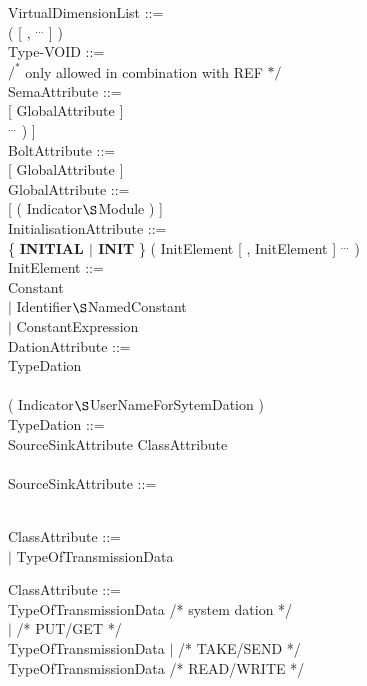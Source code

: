 VirtualDimensionList ::=\\
\x ( [ , $^{...}$ ] )\\

Type-VOID ::=\\
 \x $/^*$ only allowed in combination with REF $*/$\\

SemaAttribute ::=\\
 [ GlobalAttribute ]\\
\x [ {\bf PRESET} ( Constant-FIXED-Expression [ , Constant-FIXED-Expression ] $^{...}$ ) ]\\

BoltAttribute ::=\\
 [ GlobalAttribute ]\\

GlobalAttribute ::=\\
 [ ( Indicator$\S $Module ) ]\\

InitialisationAttribute ::=\\
\x \{ {\bf INITIAL $\mid$ INIT} \} ( InitElement [ , InitElement ] $^{...}$ )\\

InitElement ::=\\
\x Constant\\
\x $\mid$ Identifier$\S $NamedConstant\\
\x $\mid$ ConstantExpression\\

DationAttribute ::=\\
\x TypeDation\\
\x [ GlobalAttribute ]\\
 ( Indicator$\S $UserNameForSytemDation )\\

TypeDation ::=\\
 SourceSinkAttribute  ClassAttribute\\
\x [ Topology ] [ AccessAttribute ]\\

SourceSinkAttribute ::=\\
\\

\begin{removed}
ClassAttribute ::= \\
 $\mid$ TypeOfTransmissionData\\
\end{removed}
\begin{added}
ClassAttribute ::= \\
 TypeOfTransmissionData  /* system dation */\\
 $\mid$                  /* PUT/GET */ \\ 
  TypeOfTransmissionData $\mid$  /* TAKE/SEND */\\
\x  TypeOfTransmissionData               /* READ/WRITE */ \\
\end{added}

